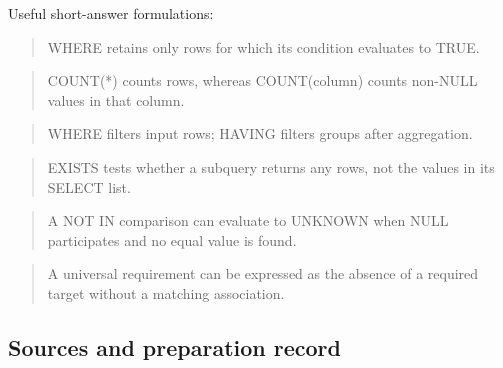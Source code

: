 Useful short-answer formulations:

\begin{quote}
WHERE retains only rows for which its condition evaluates to TRUE.
\end{quote}

\begin{quote}
COUNT(*) counts rows, whereas COUNT(column) counts non-NULL values in that column.
\end{quote}

\begin{quote}
WHERE filters input rows; HAVING filters groups after aggregation.
\end{quote}

\begin{quote}
EXISTS tests whether a subquery returns any rows, not the values in its SELECT list.
\end{quote}

\begin{quote}
A NOT IN comparison can evaluate to UNKNOWN when NULL participates and no equal value is found.
\end{quote}

\begin{quote}
A universal requirement can be expressed as the absence of a required target without a matching association.
\end{quote}

\subsection{Sources and preparation record}\label{06_sql_queries_en-sources-and-preparation-record}

